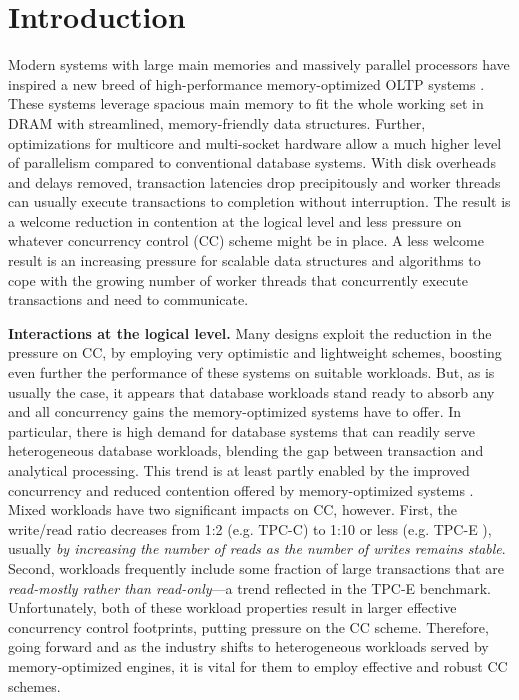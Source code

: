 
\section{Introduction}

Modern systems with large main memories and massively parallel processors have inspired a new breed of high-performance memory-optimized OLTP systems \cite{Kallman+08,PandisJHA10,KemperN11,LarsonBDFPZ11,TuZKLM13}. These systems leverage spacious main memory to fit the whole working set in DRAM with streamlined, memory-friendly data structures. Further, optimizations for multicore and multi-socket hardware allow a much higher level of parallelism compared to conventional database systems. With disk overheads and delays removed, transaction latencies drop precipitously and worker threads can usually execute transactions to completion without interruption. The result is a welcome reduction in contention at the logical level and less pressure on whatever concurrency control (CC) scheme might be in place. A less welcome result is an increasing pressure for scalable data structures and algorithms to cope with the growing number of worker threads that concurrently execute transactions and need to communicate.


\vspace{2mm}
{\bf Interactions at the logical level.} 
Many designs exploit the reduction in the pressure on CC, by employing very optimistic and lightweight schemes, boosting even further the performance of these systems on suitable workloads.
But, as is usually the case, it appears that database workloads stand ready to absorb any and all concurrency gains the memory-optimized systems have to offer. In particular, there is high demand for database systems that can readily serve heterogeneous database workloads, blending the gap between transaction and analytical processing. This trend is at least partly enabled by the improved concurrency and reduced contention offered by memory-optimized systems \cite{Farber+12}. Mixed workloads have two significant impacts on CC, however. First, the write/read ratio decreases from 1:2 (e.g. TPC-C) to 1:10 or less (e.g. TPC-E \cite{Chen+10,TozunPKJA13}), usually {\it by increasing the number of reads as the number of writes remains stable}. 
Second, workloads frequently include some fraction of large transactions that are {\it read-mostly rather than read-only}---a trend reflected in the TPC-E benchmark. Unfortunately, both of these workload properties result in larger effective concurrency control footprints, putting pressure on the CC scheme. 
Therefore, going forward and as the industry shifts to heterogeneous workloads served by memory-optimized engines, it is vital for them to employ effective and robust CC schemes. 


